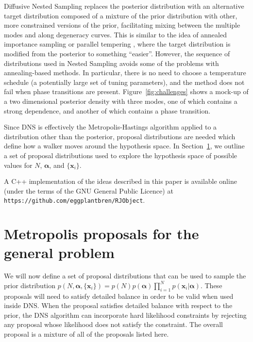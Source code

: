 \documentclass[letterpaper, 11pt]{article}
\newcommand{\hyperparams}{\boldsymbol{\alpha}}
\newcommand{\xx}{\mathbf{x}}
\begin{document}
Diffusive Nested Sampling
\citep[DNS][]{dnest} replaces the posterior distribution with an alternative target
distribution composed of a mixture of the prior distribution with other, more
constrained versions of the prior, facilitating mixing between the multiple modes
and along degeneracy curves.
This is similar to the idea of annealed importance sampling
\citep{neal} or parallel tempering \citep{pt},
where the target distribution is modified from the posterior to something
``easier''. However,
the sequence of distributions used in Nested Sampling avoids some of the
problems with annealing-based methods. In particular, there is no need to choose
a temperature schedule (a potentially large set of tuning parameters),
and the method does not fail when phase transitions
are present.
Figure~\ref{fig:challenges} shows a mock-up of a two dimensional posterior
density with three modes, one of which contains a strong dependence, and
another of which contains a phase transition.

Since DNS is effectively the Metropolis-Hastings algorithm applied to a
distribution other than the posterior, proposal distributions are needed
which define how a walker moves around the hypothesis space.
In Section~\ref{sec:proposals}, we outline a set of proposal distributions used
to explore the hypothesis space of possible values for $N$, $\hyperparams$,
and $\{\xx_i\}$.

A C++ implementation of the ideas described in this paper is available online
(under the terms of the GNU General Public Licence) at
{\tt https://github.com/eggplantbren/RJObject}.



\section{Metropolis proposals for the general problem}\label{sec:proposals}
We will now define a set of proposal distributions that can be used to
sample the prior distribution
$p(N, \hyperparams, \{\xx_i\}) = p(N) p(\hyperparams) \prod_{i=1}^N p(\xx_i | \hyperparams)$.
These proposals will need to satisfy detailed balance in order to be valid
when used inside DNS. When the proposal satisfies detailed balance with respect
to the prior, the DNS algorithm can incorporate hard likelihood constraints by
rejecting any proposal whose likelihood does not satisfy the constraint.
The overall proposal is a mixture of all of the proposals listed here.
\end{document}
